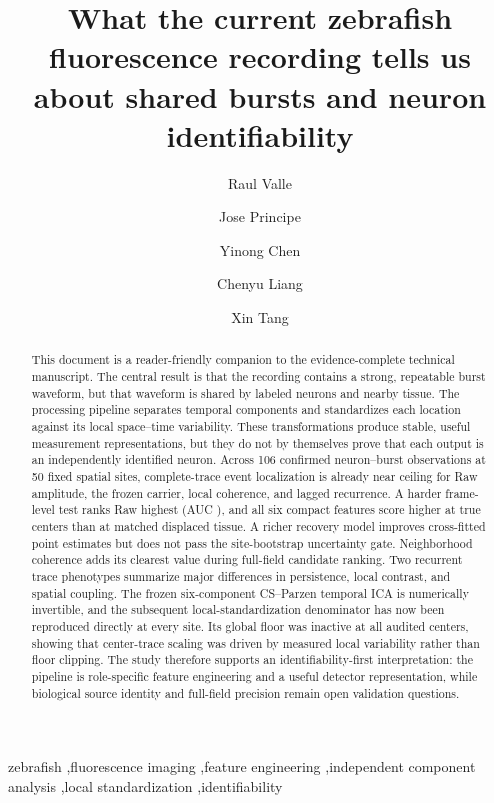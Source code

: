 \documentclass[preprint,12pt,authoryear]{elsarticle}
\begin{document}
\begin{frontmatter}

\title{What the current zebrafish fluorescence recording tells us about shared bursts and neuron identifiability}

\author[uf]{Raul Valle}
\author[affpending]{Jose Principe}
\author[affpending]{Yinong Chen}
\author[affpending]{Chenyu Liang}
\author[affpending]{Xin Tang}


\begin{abstract}
This document is a reader-friendly companion to the evidence-complete technical
manuscript. The central result is that the recording contains a strong,
repeatable burst waveform, but that waveform is shared by labeled neurons and
nearby tissue. The processing pipeline separates temporal components and
standardizes each location against its local space--time variability. These
transformations produce stable, useful measurement representations, but they do
not by themselves prove that each output is an independently identified neuron.
Across 106 confirmed neuron--burst observations at 50 fixed spatial sites,
complete-trace event localization is already near ceiling for Raw amplitude,
the frozen carrier, local coherence, and lagged recurrence. A harder frame-level
test ranks Raw highest (AUC \AutoRawAUC{}), and all six compact features score
higher at true centers than at matched displaced tissue. A richer recovery
model improves cross-fitted point estimates but does not pass the site-bootstrap
uncertainty gate. Neighborhood coherence adds its clearest value during
full-field candidate ranking. Two
recurrent trace phenotypes summarize major differences in persistence, local
contrast, and spatial coupling. The frozen six-component CS--Parzen temporal ICA
is numerically invertible, and the subsequent local-standardization denominator
has now been reproduced directly at every site. Its global floor was inactive at
all audited centers, showing that center-trace scaling was driven by measured
local variability rather than floor clipping. The study therefore supports an
identifiability-first interpretation: the pipeline is role-specific feature
engineering and a useful detector representation, while biological source identity and
full-field precision remain open validation questions.
\end{abstract}

\begin{keyword}
zebrafish \sep fluorescence imaging \sep feature engineering \sep independent component analysis \sep local standardization \sep identifiability
\end{keyword}

\end{frontmatter}

\DraftBanner




\end{document}
